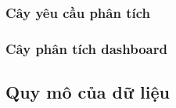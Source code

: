 \documentclass{beamer}
\begin{document}
\subsubsection{Cây yêu cầu phân tích}
\subsubsection{Cây phân tích dashboard}
\subsection{Quy mô của dữ liệu}

\end{document}
